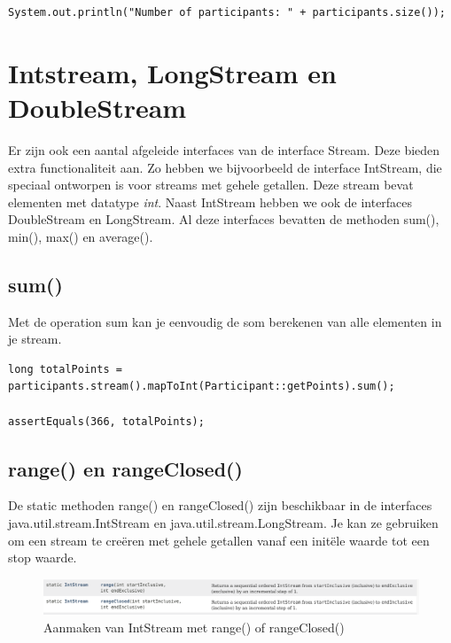 \begin{lstlisting}
System.out.println("Number of participants: " + participants.size());
\end{lstlisting}
		
\section{Intstream, LongStream en DoubleStream}
	
Er zijn ook een aantal afgeleide interfaces van de interface Stream. Deze bieden extra functionaliteit aan. Zo hebben we bijvoorbeeld de interface IntStream, die speciaal ontworpen is voor streams met gehele getallen. Deze stream bevat elementen met datatype \textit{int}. Naast IntStream hebben we ook de interfaces DoubleStream en LongStream. Al deze interfaces bevatten de methoden sum(), min(), max() en average(). 

\subsection{sum()}

Met de operation sum kan je eenvoudig de som berekenen van alle elementen in je stream.

\begin{lstlisting}
long totalPoints = participants.stream().mapToInt(Participant::getPoints).sum();

assertEquals(366, totalPoints);
\end{lstlisting}
		

\subsection{range() en rangeClosed()}
		
De static methoden range() en rangeClosed() zijn beschikbaar in de interfaces java.util.stream.IntStream en java.util.stream.LongStream. Je kan ze gebruiken om een stream te cre\"eren met gehele getallen vanaf een init\"ele waarde tot een stop waarde.
\begin{figure}[H]
  \includegraphics[width=\linewidth]{images/chapter_streams/intstream_range.png}
  \caption{Aanmaken van IntStream met range() of rangeClosed()}
  \label{fig:stream_foreach}
\end{figure}

